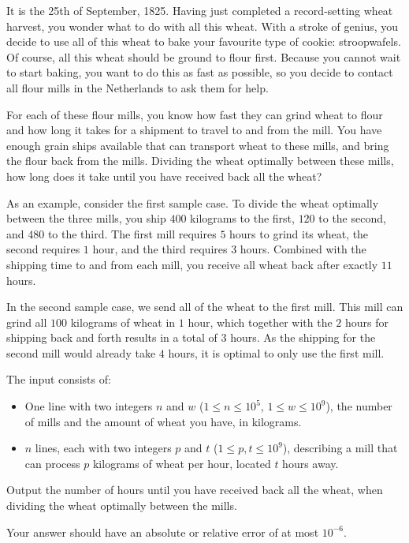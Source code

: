 

\newcommand{\maxn}{10^5}
\newcommand{\maxw}{10^9}

It is the 25th of September, 1825.
Having just completed a record-setting wheat harvest,
you wonder what to do with all this wheat.
With a stroke of genius, you decide to use all of this wheat to bake your favourite type of cookie: stroopwafels.
Of course, all this wheat should be ground to flour first.
Because you cannot wait to start baking, you want to do this as fast as possible,
so you decide to contact all flour mills in the Netherlands to ask them for help.

For each of these flour mills,
you know how fast they can grind wheat to flour
and how long it takes for a shipment to travel to and from the mill.
You have enough grain ships available that can transport wheat to these mills,
and bring the flour back from the mills.
Dividing the wheat optimally between these mills,
how long does it take until you have received back all the wheat?

As an example, consider the first sample case.
To divide the wheat optimally between the three mills,
you ship $400$ kilograms to the first, $120$ to the second, and $480$ to the third.
The first mill requires $5$ hours to grind its wheat,
the second requires $1$ hour, and the third requires $3$ hours.
Combined with the shipping time to and from each mill,
you receive all wheat back after exactly $11$ hours.

In the second sample case, we send all of the wheat to the first mill.
This mill can grind all $100$ kilograms of wheat in $1$ hour,
which together with the $2$ hours for shipping back and forth results in a total of $3$ hours.
As the shipping for the second mill would already take $4$ hours, it is optimal to only use the first mill.

\begin{Input}
    The input consists of:
    \begin{itemize}
        \item One line with two integers $n$ and $w$ ($1\leq n\leq \maxn$, $1\leq w\leq \maxw$),
            the number of mills and the amount of wheat you have, in kilograms.
        \item $n$ lines, each with two integers $p$ and $t$ ($1\leq p, t\leq \maxw$),
            describing a mill that can process $p$ kilograms of wheat per hour, located $t$ hours away.
    \end{itemize}
\end{Input}

\begin{Output}
    Output the number of hours until you have received back all the wheat,
    when dividing the wheat optimally between the mills.

    Your answer should have an absolute or relative error of at most $10^{-6}$.
\end{Output}
